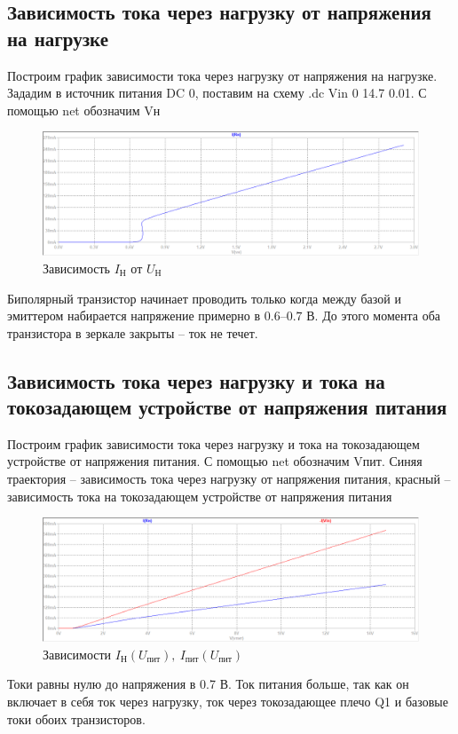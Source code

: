 \documentclass[a4paper, 12pt]{article}
\begin{document}
    \subsection{Зависимость тока через нагрузку от напряжения на нагрузке}
    Построим график зависимости тока через нагрузку от напряжения на нагрузке.
    Зададим в источник питания DC 0, поставим на схему .dc Vin 0 14.7 0.01.
    С помощью net обозначим Vн
    \begin{figure}[H]
        \centering
        \includegraphics[scale=0.46]{1task_Iн(Vн).png}
        \captionsetup{skip=0pt}
        \caption{Зависимость $I_\text{Н}$ от $U_\text{Н}$}
        \label{fig:1task_InVn}
    \end{figure}
    \noindent Биполярный транзистор начинает проводить только когда между базой
    и эмиттером набирается напряжение примерно в $0.6$--$0.7$ В. До этого момента
    оба транзистора в зеркале закрыты -- ток не течет.


    \subsection{Зависимость тока через нагрузку и тока на токозадающем устройстве от напряжения питания}
    Построим график зависимости тока через нагрузку и тока на токозадающем устройстве от напряжения питания.
    С помощью net обозначим Vпит. Синяя траектория -- зависимость тока через нагрузку от напряжения питания,
    красный -- зависимость тока на токозадающем устройстве от напряжения питания
    \begin{figure}[H]
        \centering
        \includegraphics[scale=0.46]{1task_Iн(Vпит)_Iпит(Vпит).png}
        \captionsetup{skip=0pt}
        \caption{Зависимости $I_\text{Н}\left( U_\text{пит} \right),\ I_\text{пит}\left( U_\text{пит} \right)$}
        \label{fig:1task_InVl_IlVl}
    \end{figure}
    \noindent Токи равны нулю до напряжения в 0.7 В.
    Ток питания больше, так как он включает в себя ток через нагрузку,
    ток через токозадающее плечо Q1 и базовые токи обоих транзисторов.
\end{document}
